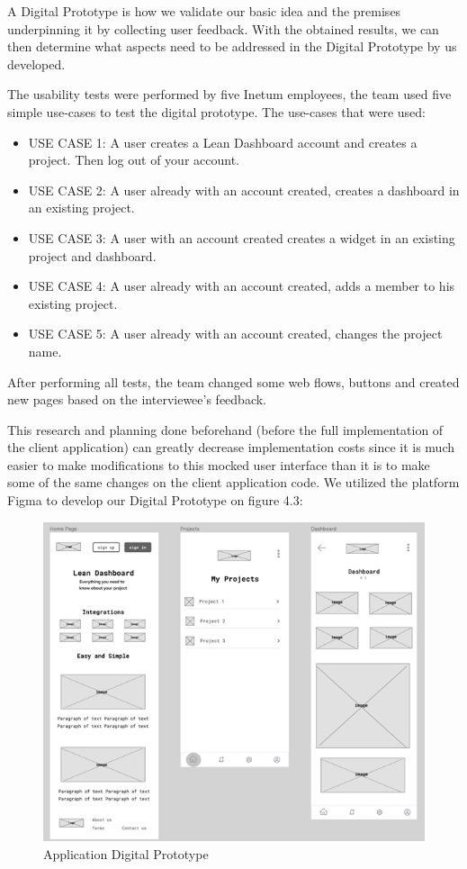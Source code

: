 \documentclass[a4paper,twoside,10pt]{report}
\begin{document}
A Digital Prototype is how we validate our basic idea and the premises underpinning it by collecting user feedback.
With the obtained results, we can then determine what aspects need to be addressed in the Digital Prototype by us developed.

The usability tests were performed by five Inetum employees, the team used five simple use-cases to test the digital prototype. The use-cases that were used: 
 \begin{itemize}
	\item USE CASE 1: A user creates a Lean Dashboard account and creates a project. Then log out of your account.
	\item USE CASE 2: A user already with an account created, creates a dashboard in an existing project.
	\item USE CASE 3: A user with an account created creates a widget in an existing project and dashboard.
	\item USE CASE 4: A user already with an account created, adds a member to his existing project.
	\item USE CASE 5: A user already with an account created, changes the project name.
\end{itemize}	

After performing all tests, the team changed some web flows, buttons and created new pages based on the interviewee's feedback. 

This research and planning done beforehand (before the full implementation of the client application) can greatly decrease implementation costs since it is much easier to make modifications to this mocked user interface than it is to make some of the same changes on the client application code.
We utilized the platform Figma\cite{FIGMA} to develop our Digital Prototype on figure 4.3:
 
\begin{figure}[h!]
\center
    \includegraphics[width=\textwidth]{digital-prototype.png}
\caption{Application Digital Prototype}
\end{figure}
\end{document}
